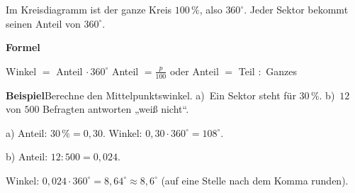 \documentclass[11pt]{article}
\makeatletter
\newlength{\kr}
\newcommand{\karomerk}[2]{\protected@write\@auxout{}{\string\karoseite{#1}{#2}{\thepage}}}
\newcommand{\karoseite}[3]{\expandafter\xdef\csname karo@#1@#2\endcsname{#3}}
\makeatother
\begin{document}
\ifdim\kr>12mm\karomerk{k}{A}\noindent{\scriptsize\color{mbgrau}Platz zum Rechnen}\par\nointerlineskip\vspace{1mm}\noindent
\begin{tikzpicture}\clip (0,0) rectangle ({\linewidth-0.5mm},\kr);\draw[black!16,line width=0.3pt,step=5mm] (0,0) grid (\linewidth,\kr);\end{tikzpicture}\fi\par
\clearpage\label{s:B}\noindent\colorbox{black!12}{}\hspace{3mm}{\Large\bfseries Mittelpunktswinkel berechnen}\par\smallskip
\noindent Im Kreisdiagramm ist der ganze Kreis $100\,\%$, also $360^\circ$. Jeder Sektor bekommt seinen Anteil von $360^\circ$.\par\medskip
\noindent\textbf{Formel}\par\nopagebreak\noindent\hspace*{4mm}\begin{minipage}{\dimexpr\linewidth-4mm\relax}Winkel $=$ Anteil $\cdot\, 360^\circ$ \qquad Anteil $= \frac{p}{100}$ oder Anteil $=$ Teil $:$ Ganzes\end{minipage}\par\medskip
\noindent\textbf{Beispiel}\quad Berechne den Mittelpunktswinkel. a)~Ein Sektor steht für $30\,\%$. b)~$12$ von $500$ Befragten antworten „weiß nicht“.\par\smallskip
\noindent\begin{minipage}[t]{0.6\linewidth}\vspace{0pt}\par\noindent{}a) Anteil: $30\,\% = 0{,}30$. Winkel: $0{,}30 \cdot 360^\circ = 108^\circ$.\par\smallskip\par\noindent{}b) Anteil: $12 : 500 = 0{,}024$.\par\smallskip\par\noindent{}Winkel: $0{,}024 \cdot 360^\circ = 8{,}64^\circ \approx 8{,}6^\circ$ (auf eine Stelle nach dem Komma runden).\par\smallskip\end{minipage}\hfill
\begin{minipage}[t]{0.37\linewidth}\vspace{0pt}\centering {}\end{minipage}\par\medskip
\end{document}
